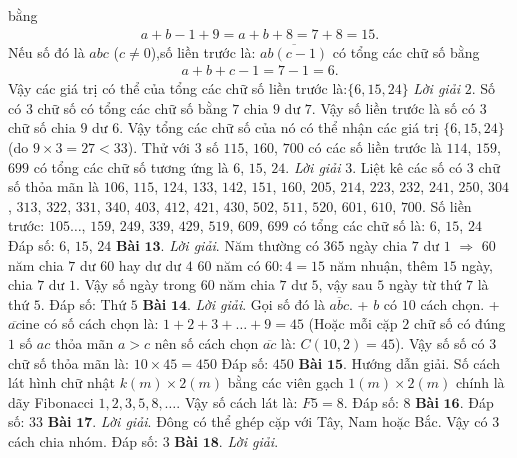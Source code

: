 \begin{multicols}{2}
	bằng
	\begin{align*}
			a+b-1+9=a+b+8=7+8=15.
		\end{align*}
	Nếu số đó là $abc$ ($c\ne0$),số liền trước là: $\overline{ab(c-1)}$ có tổng các chữ số bằng
	\begin{align*}
			a+b+c-1=7-1=6.
		\end{align*}
	Vậy các giá trị có thể của tổng các chữ số liền trước là:$\{6,15,24\}$
	\vskip 0.1cm 
	\textit{Lời giải} $2$.
	Số có $3$ chữ số có tổng các chữ số bằng $7$ chia $9$ dư $7$. Vậy số liền trước là số có $3$ chữ số chia $9$ dư $6$. Vậy tổng các chữ số của nó có thể nhận các giá trị $\{6,15,24\}$ (do $9\times 3 = 27 < 33$). Thử với $3$ số $115$, $160$, $700$ có các số liền trước là $114$, $159$, $699$ có tổng các chữ số tương ứng là $6$, $15$, $24$.
	\vskip 0.1cm
	\textit{Lời giải} $3$. Liệt kê các số có $3$ chữ số thỏa mãn là $106$, $115$, $124$, $133$, $142$, $151$, $160$, $205$, $214$, $223$, $232$, $241$, $250$, $304$, $313$, $322$, $331$, $340$, $403$, $412$, $421$, $430$, $502$, $511$, $520$, $601$, $610$, $700$.
	\vskip 0.1cm
	Số liền trước: $105\ldots$, $159$, $249$, $339$, $429$, $519$, $609$, $699$ có tổng các chữ số là: $6$, $15$, $24$
	\vskip 0.1cm
	Đáp số: $6$, $15$, $24$
	\vskip 0.1cm
	\textbf{\color{cackithi}Bài} $\pmb{13.}$ \textit{Lời giải}.
	Năm thường có $365$ ngày chia $7$ dư $1$ $\Rightarrow$ $60$ năm chia $7$ dư $60$ hay dư dư $4$
	\vskip 0.1cm
	$60$ năm có $60:4=15$ năm nhuận, thêm $15$ ngày, chia $7$ dư $1$.
	\vskip 0.1cm
	Vậy số ngày trong $60$ năm chia $7$ dư $5$, vậy sau $5$ ngày từ thứ $7$ là thứ $5$.
	\vskip 0.1cm
	Đáp số: Thứ $5$
	\vskip 0.1cm
	\textbf{\color{cackithi}Bài} $\pmb{14.}$ \textit{Lời giải}.
	Gọi số đó là $\overline{abc}$.
	\vskip 0.1cm
	+ $b$ có $1$0 cách chọn.
	\vskip 0.1cm
	+ $\overline{ac}$ine có số cách chọn là: $1+2+3+\ldots+9 = 45$ (Hoặc mỗi cặp $2$ chữ số có đúng $1$ số $ac$ thỏa mãn $a>c$ nên số cách chọn $\overline{ac}$ là: $C(10,2) = 45$).
	\vskip 0.1cm
	Vậy số số có $3$ chữ số thỏa mãn là: $10\times45=450$
	\vskip 0.1cm
	Đáp số: $450$ 
	\vskip 0.1cm
	\textbf{\color{cackithi}Bài} $\pmb{15.}$ Hướng dẫn giải.
	Số cách lát hình chữ nhật $k(m) \times 2(m)$ bằng các viên gạch $1(m)\times2(m)$ chính là dãy Fibonacci $1,2,3,5,8,\ldots$. Vậy số cách lát là: $F5 = 8$.
	\vskip 0.1cm
	Đáp số: $8$
	\vskip 0.1cm
	\textbf{\color{cackithi}Bài} $\pmb{16.}$ Đáp số: $33$
	\vskip 0.1cm 
	\textbf{\color{cackithi}Bài} $\pmb{17.}$ \textit{Lời giải}. Đông có thể ghép cặp với Tây, Nam hoặc Bắc. Vậy có $3$ cách chia nhóm.
	\vskip 0.1cm
	Đáp số: $3$
	\vskip 0.1cm
	\textbf{\color{cackithi}Bài} $\pmb{18.}$ \textit{Lời giải}.

\end{multicols}
